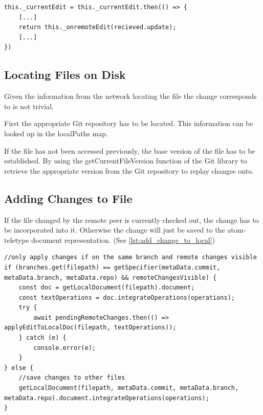 \begin{lstlisting}[label={lst:promise_chain}, caption=Network Promise Chain]
this._currentEdit = this._currentEdit.then(() => {
    [...]
    return this._onremoteEdit(recieved.update);
    [...]
})
\end{lstlisting}

\subsection{Locating Files on Disk}

Given the information from the network locating the file the change corresponds to is not trivial.

First the appropriate Git repository has to be located.
This information can be looked up in the localPaths map.

If the file has not been accessed previously, the base version of the file has to be established.
By using the getCurrentFileVersion function of the Git library to retrieve the appropriate version from the Git repository to replay changes onto.

\subsection{Adding Changes to File}

If the file changed by the remote peer is currently checked out, the change has to be incorporated into it. Otherwise the change will just be saved to the atom-teletype document representation. (See \autoref{lst:add_change_to_local})

\begin{lstlisting}[label={lst:add_change_to_local}, caption=Adding Change to Local Document]
//only apply changes if on the same branch and remote changes visible
if (branches.get(filepath) == getSpecifier(metaData.commit, metaData.branch, metaData.repo) && remoteChangesVisible) {
    const doc = getLocalDocument(filepath).document;
    const textOperations = doc.integrateOperations(operations);
    try {
        await pendingRemoteChanges.then(() => applyEditToLocalDoc(filepath, textOperations));
    } catch (e) {
        console.error(e);
    }
} else {
    //save changes to other files
    getLocalDocument(filepath, metaData.commit, metaData.branch, metaData.repo).document.integrateOperations(operations);
}
\end{lstlisting}